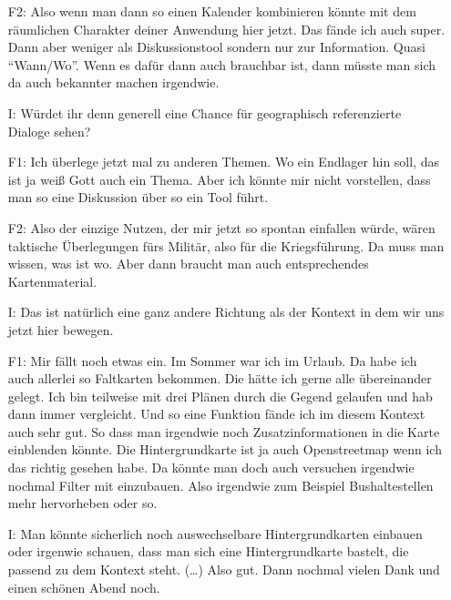 \begin{itemize}
    \item[F2:] Also wenn man dann so einen Kalender kombinieren k{\"o}nnte mit dem r{\"a}umlichen Charakter deiner Anwendung hier jetzt. Das f{\"a}nde ich auch super. Dann aber weniger als Diskussionstool sondern nur zur Information. Quasi "`Wann/Wo"'. Wenn es daf{\"u}r dann auch brauchbar ist, dann m{\"u}sste man sich da auch bekannter machen irgendwie.
    \item[I:] W{\"u}rdet ihr denn generell eine Chance f{\"u}r geographisch referenzierte Dialoge sehen?
    \item[F1:] Ich {\"u}berlege jetzt mal zu anderen Themen. Wo ein Endlager hin soll, das ist ja wei{\ss} Gott auch ein Thema. Aber ich k{\"o}nnte mir nicht vorstellen, dass man so eine Diskussion {\"u}ber so ein Tool f{\"u}hrt.
    \item[F2:] Also der einzige Nutzen, der mir jetzt so spontan einfallen w{\"u}rde, w{\"a}ren taktische {\"U}berlegungen f{\"u}rs Milit{\"a}r, also f{\"u}r die Kriegsf{\"u}hrung. Da muss man wissen, was ist wo. Aber dann braucht man auch entsprechendes Kartenmaterial.
    \item[I:] Das ist nat{\"u}rlich eine ganz andere Richtung als der Kontext in dem wir uns jetzt hier bewegen.
    \item[F1:] Mir f{\"a}llt noch etwas ein. Im Sommer war ich im Urlaub. Da habe ich auch allerlei so Faltkarten bekommen. Die h{\"a}tte ich gerne alle {\"u}bereinander gelegt. Ich bin teilweise mit drei Pl{\"a}nen durch die Gegend gelaufen und hab dann immer vergleicht. Und so eine Funktion f{\"a}nde ich im diesem Kontext auch sehr gut. So dass man irgendwie noch Zusatzinformationen in die Karte einblenden k{\"o}nnte. Die Hintergrundkarte ist ja auch Openstreetmap wenn ich das richtig gesehen habe. Da k{\"o}nnte man doch auch versuchen irgendwie nochmal Filter mit einzubauen. Also irgendwie zum Beispiel Bushaltestellen mehr hervorheben oder so.
    \item[I:] Man k{\"o}nnte sicherlich noch auswechselbare Hintergrundkarten einbauen oder irgenwie schauen, dass man sich eine Hintergrundkarte bastelt, die passend zu dem Kontext steht. (\dots) Also gut. Dann nochmal vielen Dank und einen sch{\"o}nen Abend noch.
\end{itemize}